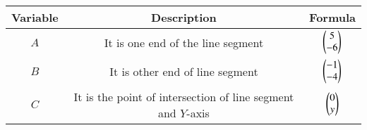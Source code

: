 \begin{center}
    \begin{tabular}{|c|c|c|} 
        \hline
            \textbf{Variable} & \textbf{Description} & \textbf{Formula} \\ 
        \hline
            $A$   & It is one end of the line segment & $\begin{pmatrix}5 \\ -6\end{pmatrix}$ \\ 
        \hline
            $B$   & It is other end of line segment &  $\begin{pmatrix}-1\\-4\end{pmatrix}$\\ 
        \hline
            $C$   & It is the point of intersection of line segment and $Y$-axis & $\begin{pmatrix}0\\y\end{pmatrix}$\\ 
        \hline
        
    \end{tabular}
\end{center}  

